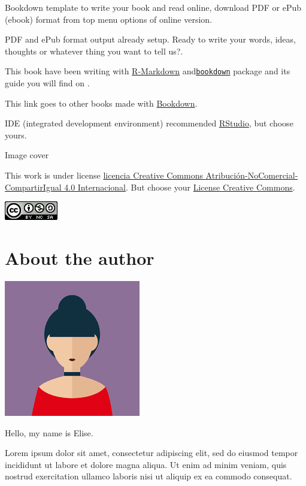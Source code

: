 \documentclass[
  english,
  a4paper,
  openany]{book}
\begin{document}
Bookdown template to write your book and read online, download PDF or ePub (ebook) format from top menu options of online version.

PDF and ePub format output already setup. Ready to write your words, ideas, thoughts or whatever thing you want to tell us?.

This book have been writing with \href{http://rmarkdown.rstudio.com}{R-Markdown} and\href{https://bookdown.org/}{\texttt{bookdown}} package and its guide you will find on \citep{R-bookdown}.

This link goes to other books made with \href{https://bookdown.org/home/archive/}{Bookdown}.

IDE (integrated development environment) recommended \href{https://rstudio.com/products/rstudio/download/}{RStudio}, but choose yours.

Image cover \citep{photopea}

This work is under license \href{https://creativecommons.org/licenses/by-nc-sa/4.0/deed.es}{licencia Creative Commons Atribución-NoComercial-CompartirIgual 4.0 Internacional}. But choose your \href{https://creativecommons.org/}{License Creative Commons}.

\begin{flushleft}\includegraphics{images/by-nc-sa-88x31} \end{flushleft}

\hypertarget{author}{%
\chapter*{About the author}\label{author}}

\begin{flushleft}\includegraphics[width=0.25\linewidth]{images/photo-profile} \end{flushleft}

Hello, my name is Elise.

Lorem ipsum dolor sit amet, consectetur adipiscing elit, sed do eiusmod tempor incididunt ut labore et dolore magna aliqua. Ut enim ad minim veniam, quis nostrud exercitation ullamco laboris nisi ut aliquip ex ea commodo consequat.
\end{document}
